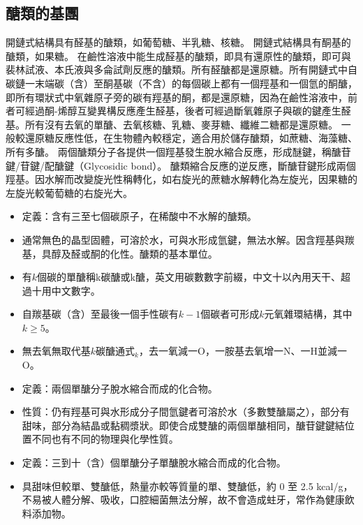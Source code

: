 \documentclass[a4paper,12pt]{report}
\begin{document}
\begin{itemize}
\subsection{醣類的基團}
開鏈式結構具有醛基的醣類，如葡萄糖、半乳糖、核糖。
開鏈式結構具有酮基的醣類，如果糖。
在鹼性溶液中能生成醛基的醣類，即具有還原性的醣類，即可與裴林試液、本氏液與多侖試劑反應的醣類。所有醛醣都是還原糖。所有開鏈式中自碳鏈一末端碳（含）至酮基碳（不含）的每個碳上都有一個羥基和一個氫的酮醣，即所有環狀式中氧雜原子旁的碳有羥基的酮，都是還原糖，因為在鹼性溶液中，前者可經過酮-烯醇互變異構反應產生醛基，後者可經過斷氧雜原子與碳的鍵產生醛基。所有沒有去氧的單醣、去氧核糖、乳糖、麥芽糖、纖維二糖都是還原糖。
一般較還原糖反應性低，在生物體內較穩定，適合用於儲存醣類，如蔗糖、海藻糖、所有多醣。
兩個醣類分子各提供一個羥基發生脫水縮合反應，形成醚鍵，稱醣苷鍵/苷鍵/配醣鍵（Glycosidic bond）。
醣類縮合反應的逆反應，斷醣苷鍵形成兩個羥基。因水解而改變旋光性稱轉化，如右旋光的蔗糖水解轉化為左旋光，因果糖的左旋光較葡萄糖的右旋光大。
\begin{itemize}
\item 定義：含有三至七個碳原子，在稀酸中不水解的醣類。
\item 通常無色的晶型固體，可溶於水，可與水形成氫鍵，無法水解。因含羥基與羰基，具醇及醛或酮的化性。醣類的基本單位。
\item 有$k$個碳的單醣稱k碳醣或k醣，英文用碳數數字前綴，中文十以內用天干、超過十用中文數字。
\item 自羰基碳（含）至最後一個手性碳有$k-1$個碳者可形成$k$元氧雜環結構，其中$k\geq 5$。
\item 無去氧無取代基$k$碳醣通式$_k$，去一氧減一O，一胺基去氧增一N、一H並減一O。
\end{itemize}
\begin{itemize}
\item 定義：兩個單醣分子脫水縮合而成的化合物。
\item 性質：仍有羥基可與水形成分子間氫鍵者可溶於水（多數雙醣屬之），部分有甜味，部分為結晶或黏稠漿狀。即使合成雙醣的兩個單醣相同，醣苷鍵鍵結位置不同也有不同的物理與化學性質。
\end{itemize}
\begin{itemize}
\item 定義：三到十（含）個單醣分子單醣脫水縮合而成的化合物。
\item 具甜味但較單、雙醣低，熱量亦較等質量的單、雙醣低，約 0 至 2.5 kcal/g，不易被人體分解、吸收，口腔細菌無法分解，故不會造成蛀牙，常作為健康飲料添加物。

\end{itemize}
\end{itemize}
\end{document}
